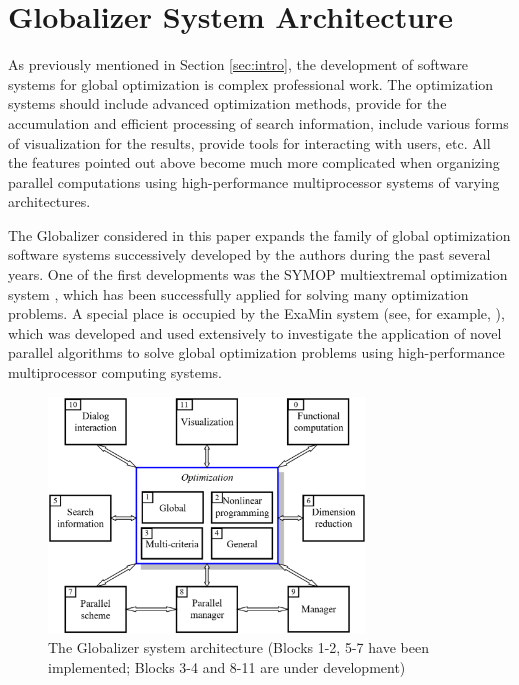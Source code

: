 \documentclass{gOMS2e}
\theoremstyle{plain}%
\theoremstyle{definition}
\theoremstyle{remark}
\begin{document}
\section{Globalizer System Architecture}
\label{sec:arch}
As previously mentioned in Section \ref{sec:intro}, the development of software systems
for global optimization is complex professional work. The optimization systems should
include advanced optimization methods, provide for the accumulation and efficient
processing of search information, include various forms of visualization for the results,
provide tools for interacting with users, etc. All the features pointed out above
become much more complicated when organizing parallel computations using high-performance
multiprocessor systems of varying architectures.
\par
The Globalizer considered in this paper expands the family of global optimization
software systems successively developed by the authors during the past several years.
One of the first developments was the SYMOP multiextremal optimization system \cite{gergel1993},
which has been successfully applied for solving many optimization problems. A special
place is occupied by the ExaMin system (see, for example, \cite{barkalovGergel2015}),
which was developed and used extensively to investigate the application of novel parallel
algorithms to solve global optimization problems using high-performance multiprocessor computing systems.

\begin{figure}[h!]
    \centering
		\includegraphics[width=0.75\textwidth]{pictures/globalizerScheme.eps}
		\caption{The Globalizer system architecture (Blocks 1-2, 5-7 have been implemented; Blocks 3-4 and 8-11 are under development)}
    \label{fig:globalizerScheme}
\end{figure}
\end{document}
